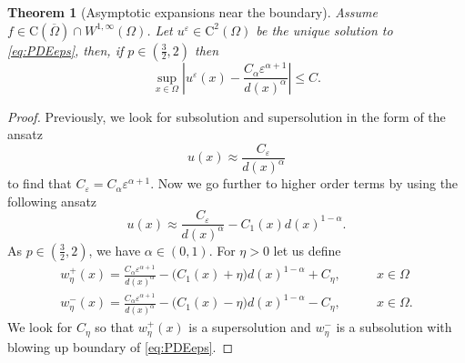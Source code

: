 \documentclass[11pt,reqno]{amsart}
\numberwithin{figure}{section}
\theoremstyle{plain}
\newtheorem{thm}{Theorem}[section]
\theoremstyle{remark}
\numberwithin{equation}{section}
\begin{document}
\begin{appendices}
\begin{thm}[Asymptotic expansions near the boundary] Assume $f\in \mathrm{C}(\overline{\Omega})\cap W^{1,\infty}(\Omega)$. Let $u^\varepsilon\in \mathrm{C}^2(\Omega)$ be the unique solution to \eqref{eq:PDEeps}, then, if $p\in \left(\frac{3}{2},2\right)$ then
\begin{equation*}
    \sup_{x\in \Omega}\left|u^\varepsilon(x) - \frac{C_\alpha\varepsilon^{\alpha+1}}{d(x)^\alpha} \right| \leq C.
\end{equation*}
\end{thm}
\begin{proof} Previously, we look for subsolution and supersolution in the form of the ansatz
\begin{equation*}
    u(x)\approx \frac{C_\varepsilon}{d(x)^\alpha}
\end{equation*}
to find that $C_\varepsilon = C_\alpha\varepsilon^{\alpha+1}$. Now we go further to higher order terms by using the following ansatz
\begin{equation*}
    u(x)\approx \frac{C_\varepsilon}{d(x)^\alpha} - C_1(x)d(x)^{1-\alpha}.
\end{equation*}
As $p\in \left(\frac{3}{2},2\right)$, we have $\alpha\in (0,1)$. For $\eta > 0$ let us define
\begin{align*}
    w^+_{\eta}(x) = \frac{C_\alpha \varepsilon^{\alpha+1}}{d(x)^{\alpha}} - \big(C_1(x)+\eta\big)d(x)^{1-\alpha} + C_\eta, &\qquad x\in \Omega\\
    w^-_{\eta}(x) = \frac{C_\alpha \varepsilon^{\alpha+1}}{d(x)^{\alpha}} - \big(C_1(x)-\eta\big)d(x)^{1-\alpha} - C_\eta, &\qquad x\in \Omega.
\end{align*}
We look for $C_\eta$ so that $w^+_{\eta}(x)$ is a supersolution and $w^-_\eta$ is a subsolution with blowing up boundary of \eqref{eq:PDEeps}.
\end{proof}


\end{appendices}
\end{document}

